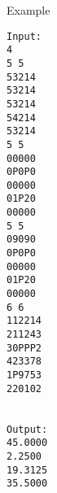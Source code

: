 Example
\begin{verbatim}
Input:
4
5 5
53214
53214
53214
54214
53214
5 5
00000
0P0P0
00000
01P20
00000
5 5
09090
0P0P0
00000
01P20
00000
6 6
112214
211243
30PPP2
423378
1P9753
220102


Output:
45.0000
2.2500
19.3125
35.5000

\end{verbatim}
